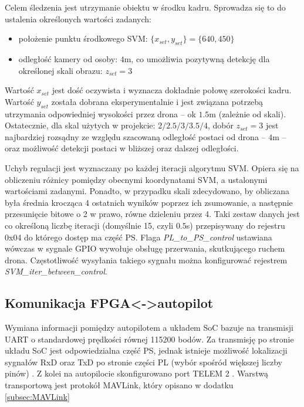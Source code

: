 
Celem śledzenia jest utrzymanie obiektu w środku kadru. Sprowadza się to do ustalenia określonych wartości zadanych:
\begin{itemize}
	\item położenie punktu środkowego SVM: $\{x_{set},y_{set}\}=\{640,450\}$ 
	\item odległość kamery od osoby: $4$m, co umożliwia pozytywną detekcję dla określonej skali obrazu: $z_{set}=3$ %
\end{itemize}
Wartość $x_{set}$ jest dość oczywista i wyznacza dokładnie połowę szerokości kadru.
Wartość $y_{set}$ została dobrana eksperymentalnie i jest związana potrzebą utrzymania odpowiedniej wysokości przez drona -- ok $1.5$m (zależnie od skali).
Ostatecznie, dla skal użytych w projekcie: $2/2.5/3/3.5/4$, dobór $z_{set}=3$ jest najbardziej rozsądny ze względu szacowaną odległość postaci od drona -- $4$m -- oraz możliwość detekcji postaci w bliższej oraz dalszej odległości.

Uchyb regulacji jest wyznaczany po każdej iteracji algorytmu SVM. 
Opiera się na obliczeniu różnicy pomiędzy obecnymi koordynatami SVM, a ustalonymi wartościami zadanymi. %
Ponadto, w przypadku skali zdecydowano, by obliczana była średnia krocząca 4 ostatnich wyników poprzez ich zsumowanie, a następnie przesunięcie bitowe o 2 w prawo, równe dzieleniu przez 4.
Taki zestaw danych jest co określoną liczbę iteracji (domyślnie 15, czyli $0.5$s) przepisywany do rejestru 0x04 do którego dostęp ma część PS. Flaga \textit{PL\_to\_PS\_control} ustawiana wówczas w sygnale GPIO wywołuje obsługę przerwania, skutkującego ruchem drona. Częstotliwość wysyłania takiego sygnału można konfigurować rejestrem \textit{SVM\_iter\_between\_control}.


\subsection{Komunikacja FPGA<->autopilot} %

Wymiana informacji pomiędzy autopilotem a układem SoC bazuje na transmisji UART o standardowej prędkości równej 115200 bodów. 
Za transmisję po stronie układu SoC jest odpowiedzialna część PS, jednak istnieje możliwość lokalizacji sygnałów RxD oraz TxD po stronie części PL (wybór spośród większej liczby pinów) \cite{PYNQ_sch}. 
Z kolei na autopilocie skonfigurowano port TELEM 2 \cite{PixhawkSerial}. Warstwą transportową jest protokół MAVLink, który opisano w dodatku \ref{subsec:MAVLink}

